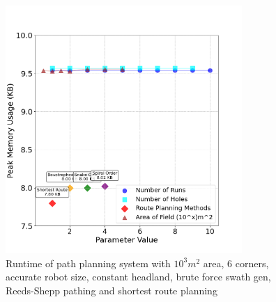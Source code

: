 \documentclass[final]{cmpreport_02}
\begin{document}
\begin{figure}[h!]
	\centering
	\includegraphics[width=0.8\textwidth]{./images/pathingMem.png}
	\caption{Runtime of path planning system with $10^3m^2$ area, 6 corners, accurate robot size, constant headland, brute force swath gen, Reeds-Shepp pathing and shortest route planning}
	\label{PE:p:Mem}
\end{figure}


%
%
%
%
%
%
\end{document}
